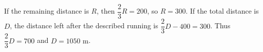 If the remaining distance is $R$, then $\dfrac{2}{3}R=200$, so $R=300$. If the total distance is $D$, the distance left after the described running is $\dfrac{2}{3}D-400=300$. Thus $\dfrac{2}{3}D=700$ and $\boxed{D=1050\text{ m}}$.
